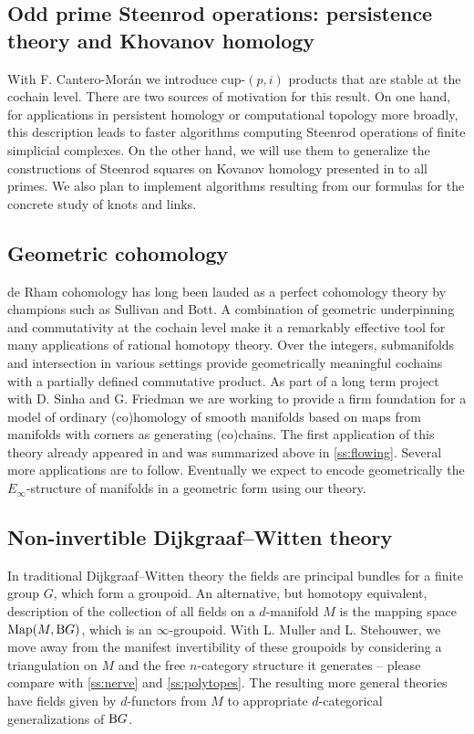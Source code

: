 \subsection{Odd prime Steenrod operations: persistence theory and Khovanov homology} \label{ss:odd prime steenrod operations}

With F. Cantero-Mor\'an we introduce cup-$(p,i)$ products that are stable at the cochain level.
There are two sources of motivation for this result.
On one hand, for applications in persistent homology or computational topology more broadly, this description leads to faster algorithms computing Steenrod operations of finite simplicial complexes.
On the other hand, we will use them to generalize the constructions of Steenrod squares on Kovanov homology presented in \cite{cantero-moran2020khovanov} to all primes.
We also plan to implement algorithms resulting from our formulas for the concrete study of knots and links.

\subsection{Geometric cohomology} \label{ss:geometric cohomology}

de Rham cohomology has long been lauded as a perfect cohomology theory by champions such as Sullivan and Bott.
A combination of geometric underpinning and commutativity at the cochain level make it a remarkably effective tool for many applications of rational homotopy theory.
Over the integers, submanifolds and intersection in various settings provide geometrically meaningful cochains with a partially defined commutative product.
As part of a long term project with D. Sinha and G. Friedman we are working to provide a firm foundation for a model of ordinary (co)homology of smooth manifolds based on maps from manifolds with corners as generating (co)chains.
The first application of this theory already appeared in \cite{medina2021flowing} and was summarized above in \cref{ss:flowing}.
Several more applications are to follow.
Eventually we expect to encode geometrically the $E_\infty$-structure of manifolds in a geometric form using our theory.

\subsection{Non-invertible Dijkgraaf--Witten theory}

In traditional Dijkgraaf--Witten theory the fields are principal bundles for a finite
group $G$, which form a groupoid.
An alternative, but homotopy equivalent, description of the collection of all fields on a $d$-manifold $M$ is the mapping space $\mathrm{Map}(M, \mathrm{B} G)$, which is an $\infty$-groupoid.
With L. Muller and L. Stehouwer, we move away from the manifest invertibility of these groupoids by
considering a triangulation on $M$ and the free $n$-category structure it generates -- please compare with \cref{ss:nerve} and \cref{ss:polytopes}.
The resulting more general theories have fields given by $d$-functors from $M$ to appropriate $d$-categorical generalizations of $\mathrm{B} G$.